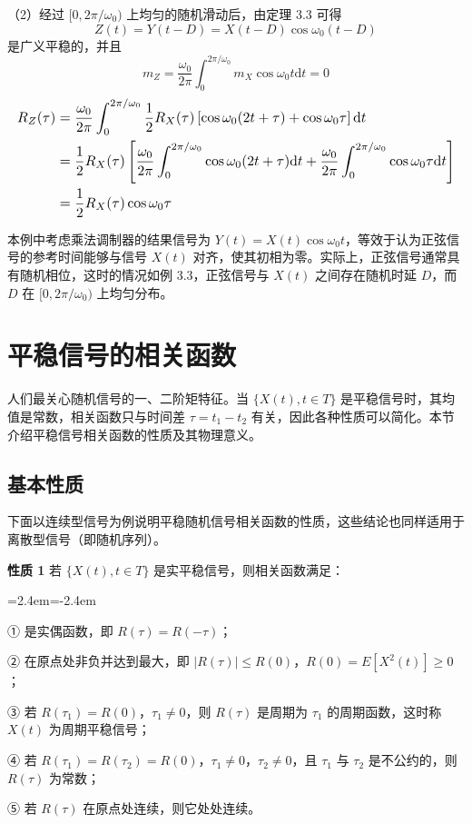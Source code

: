 \documentclass[11pt,openany,UTF8]{ctexbook}
\newcommand{\dif}{\mathrm{d}}                      %
\newcommand{\E}{E}                                 %
\newcommand{\thm}[1]{\par\medskip\noindent\textbf{#1}\quad}
\newenvironment{citemize}
  {\begin{list}{}{\leftmargin=2.4em\itemindent=-2.4em\itemsep=1pt\topsep=3pt\parsep=0pt}}
  {\end{list}}
\newcommand{\fw}[1]{{\xeCJKsetup{CJKecglue={}}（#1\nobreak）}}
\begin{document}
\begin{examplebox}
\fw{2}经过 $[0,2\pi/\omega_0)$ 上均匀的随机滑动后\nobreak，由定理 3.3 可得
\[
Z(t)=Y(t-D)=X(t-D)\cos\omega_0(t-D)
\]
是广义平稳的\nobreak，并且
\[
m_Z=\frac{\omega_0}{2\pi}\int_0^{2\pi/\omega_0}m_X\cos\omega_0t\dif t=0
\]
\[
\resizebox{\linewidth}{!}{$\displaystyle
\begin{aligned}
R_Z(\tau)&=\frac{\omega_0}{2\pi}\int_0^{2\pi/\omega_0}\frac{1}{2}R_X(\tau)\left[\cos\omega_0(2t+\tau)+\cos\omega_0\tau\right]\dif t\\
&=\frac{1}{2}R_X(\tau)\left[\frac{\omega_0}{2\pi}\int_0^{2\pi/\omega_0}\cos\omega_0(2t+\tau)\dif t+\frac{\omega_0}{2\pi}\int_0^{2\pi/\omega_0}\cos\omega_0\tau\dif t\right]\\
&=\frac{1}{2}R_X(\tau)\cos\omega_0\tau
\end{aligned}$}
\]
\end{examplebox}

本例中考虑乘法调制器的结果信号为 $Y(t)=X(t)\cos\omega_0t$\nobreak，等效于认为正弦信号的参考时间能够与信号 $X(t)$ 对齐\nobreak，使其初相为零\nobreak。实际上\nobreak，正弦信号通常具有随机相位\nobreak，这时的情况如例 3.3\nobreak，正弦信号与 $X(t)$ 之间存在随机时延 $D$\nobreak，而 $D$ 在 $[0,2\pi/\omega_0)$ 上均匀分布\nobreak。

\section{平稳信号的相关函数}
人们最关心随机信号的一\nobreak、二阶矩特征\nobreak。当 $\{X(t),t\in T\}$ 是平稳信号时\nobreak，其均值是常数\nobreak，相关函数只与时间差 $\tau=t_1-t_2$ 有关\nobreak，因此各种性质可以简化\nobreak。本节介绍平稳信号相关函数的性质及其物理意义\nobreak。

\subsection{基本性质}
下面以连续型信号为例说明平稳随机信号相关函数的性质\nobreak，这些结论也同样适用于离散型信号（即随机序列\nobreak）\nobreak。

\thm{性质 1} 若 $\{X(t),t\in T\}$ 是实平稳信号\nobreak，则相关函数满足\nobreak：
\begin{citemize}
\item ① 是实偶函数\nobreak，即 $R(\tau)=R(-\tau)$\nobreak；
\item ② 在原点处非负并达到最大\nobreak，即 $\lvert R(\tau)\rvert\leqslant R(0)$\nobreak，$R(0)=\E[X^2(t)]\geqslant 0$\nobreak；
\item ③ 若 $R(\tau_1)=R(0)$\nobreak，$\tau_1\neq 0$\nobreak，则 $R(\tau)$ 是周期为 $\tau_1$ 的周期函数\nobreak，这时称 $X(t)$ 为周期平稳信号\nobreak；
\item ④ 若 $R(\tau_1)=R(\tau_2)=R(0)$\nobreak，$\tau_1\neq 0$\nobreak，$\tau_2\neq 0$\nobreak，且 $\tau_1$ 与 $\tau_2$ 是不公约的\nobreak，则 $R(\tau)$ 为常数\nobreak；
\item ⑤ 若 $R(\tau)$ 在原点处连续\nobreak，则它处处连续\nobreak。
\end{citemize}
\end{document}
